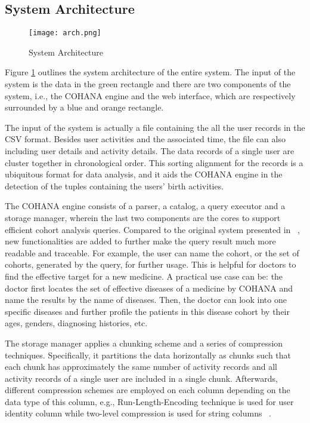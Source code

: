 \subsection{System Architecture}

\begin{figure}
    \centering
    \texttt{[image: arch.png]}
    \caption{System Architecture}
    \label{fig:sys_arch}
\end{figure}

Figure \ref{fig:sys_arch} outlines the system architecture of the entire system. The input of the system is the data in the green rectangle and there are two components of the system, i.e., the COHANA engine and the web interface, which are respectively surrounded by a blue and orange rectangle. 

The input of the system is actually a file containing the all the user records in the CSV format. 
Besides user activities and the associated time, the file can also 
including user details and activity details.
The data records of a single user are cluster together in chronological order. 
This sorting alignment for the records is a ubiquitous format for data analysis, and it aids the COHANA engine in the detection of the tuples containing the users' birth activities.

The COHANA engine consists of a parser, a catalog, a query executor and a storage manager, wherein the last two components are the cores to support efficient cohort analysis queries. 
Compared to the original system presented in ~\cite{jiang2016cohort}, new functionalities are added to further make the query result much more readable and traceable.
For example, the user can name the cohort, or the set of cohorts, generated by the query, for further usage.
This is helpful for doctors to find the effective target for a new medicine. 
A practical use case can be: the doctor first locates the set of effective diseases of a medicine by COHANA and name the results by the name of diseases. Then, the doctor can look into one specific diseases and further profile the patients in this disease cohort by their ages, genders, diagnosing histories, etc.

The storage manager applies a chunking scheme and a series of compression techniques. Specifically, it partitions the data horizontally as chunks such that each chunk has approximately the same number of activity records and all activity records of a single user are included in a single chunk. Afterwards, different compression schemes are employed on each column depending on the data type of this column, e.g., Run-Length-Encoding technique is used for user identity column while two-level compression is used for string columns ~\cite{jiang2016cohort}. %

